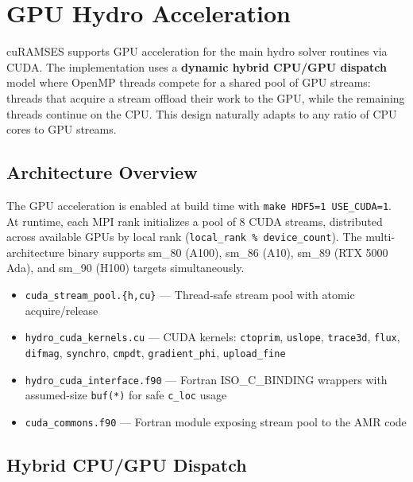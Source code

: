 \documentclass[11pt,fleqn]{book}
\begin{document}
\chapter{GPU Hydro Acceleration}
\label{ch:gpu}

cuRAMSES supports GPU acceleration for the main hydro solver routines via CUDA.  The implementation uses a \textbf{dynamic hybrid CPU/GPU dispatch} model where OpenMP threads compete for a shared pool of GPU streams: threads that acquire a stream offload their work to the GPU, while the remaining threads continue on the CPU.  This design naturally adapts to any ratio of CPU cores to GPU streams.

\section{Architecture Overview}

The GPU acceleration is enabled at build time with \texttt{make HDF5=1 USE\_CUDA=1}.  At runtime, each MPI rank initializes a pool of 8 CUDA streams, distributed across available GPUs by local rank (\texttt{local\_rank \% device\_count}).  The multi-architecture binary supports sm\_80 (A100), sm\_86 (A10), sm\_89 (RTX 5000 Ada), and sm\_90 (H100) targets simultaneously.

\begin{infobox}
\begin{itemize}[nosep,leftmargin=1.5em]
\item \texttt{cuda\_stream\_pool.\{h,cu\}} --- Thread-safe stream pool with atomic acquire/release
\item \texttt{hydro\_cuda\_kernels.cu} --- CUDA kernels: \texttt{ctoprim}, \texttt{uslope}, \texttt{trace3d}, \texttt{flux}, \texttt{difmag}, \texttt{synchro}, \texttt{cmpdt}, \texttt{gradient\_phi}, \texttt{upload\_fine}
\item \texttt{hydro\_cuda\_interface.f90} --- Fortran ISO\_C\_BINDING wrappers with assumed-size \texttt{buf(*)} for safe \texttt{c\_loc} usage
\item \texttt{cuda\_commons.f90} --- Fortran module exposing stream pool to the AMR code
\end{itemize}
\end{infobox}

\section{Hybrid CPU/GPU Dispatch}
\end{document}
